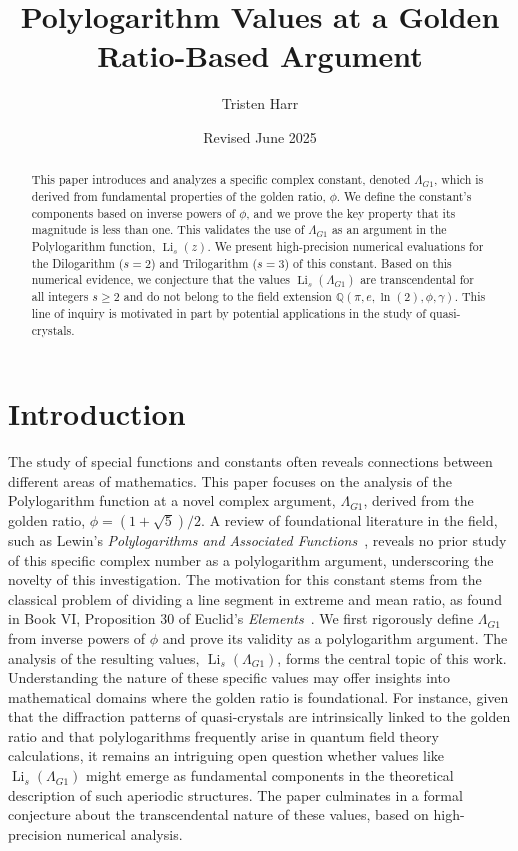 \documentclass{amsart}
\theoremstyle{plain}
\theoremstyle{definition}
\theoremstyle{remark}
\DeclareMathOperator{\Li}{Li} %
\newcommand{\LambdaG}{\Lambda_{G1}}
\newcommand{\phiG}{\phi}
\begin{document}
\title[Polylogarithms at a Golden Ratio Argument]{Polylogarithm Values at a Golden Ratio-Based Argument}
\author{Tristen Harr}
\date{Revised June 2025}

\begin{abstract}
This paper introduces and analyzes a specific complex constant, denoted $\LambdaG$, which is derived from fundamental properties of the golden ratio, $\phiG$. We define the constant's components based on inverse powers of $\phiG$, and we prove the key property that its magnitude is less than one. This validates the use of $\LambdaG$ as an argument in the Polylogarithm function, $\Li_s(z)$. We present high-precision numerical evaluations for the Dilogarithm ($s=2$) and Trilogarithm ($s=3$) of this constant. Based on this numerical evidence, we conjecture that the values $\Li_s(\LambdaG)$ are transcendental for all integers $s \ge 2$ and do not belong to the field extension $\mathbb{Q}(\pi, e, \ln(2), \phiG, \gamma)$. This line of inquiry is motivated in part by potential applications in the study of quasi-crystals.
\end{abstract}

\maketitle

\section{Introduction}
The study of special functions and constants often reveals connections between different areas of mathematics. This paper focuses on the analysis of the Polylogarithm function at a novel complex argument, $\LambdaG$, derived from the golden ratio, $\phiG = (1+\sqrt{5})/2$. A review of foundational literature in the field, such as Lewin's \textit{Polylogarithms and Associated Functions}~\cite{Lewin}, reveals no prior study of this specific complex number as a polylogarithm argument, underscoring the novelty of this investigation. The motivation for this constant stems from the classical problem of dividing a line segment in extreme and mean ratio, as found in Book VI, Proposition 30 of Euclid's \textit{Elements}~\cite{Euclid}. We first rigorously define $\LambdaG$ from inverse powers of $\phiG$ and prove its validity as a polylogarithm argument. The analysis of the resulting values, $\Li_s(\LambdaG)$, forms the central topic of this work. Understanding the nature of these specific values may offer insights into mathematical domains where the golden ratio is foundational. For instance, given that the diffraction patterns of quasi-crystals are intrinsically linked to the golden ratio and that polylogarithms frequently arise in quantum field theory calculations, it remains an intriguing open question whether values like $\Li_s(\LambdaG)$ might emerge as fundamental components in the theoretical description of such aperiodic structures. The paper culminates in a formal conjecture about the transcendental nature of these values, based on high-precision numerical analysis.
\end{document}
